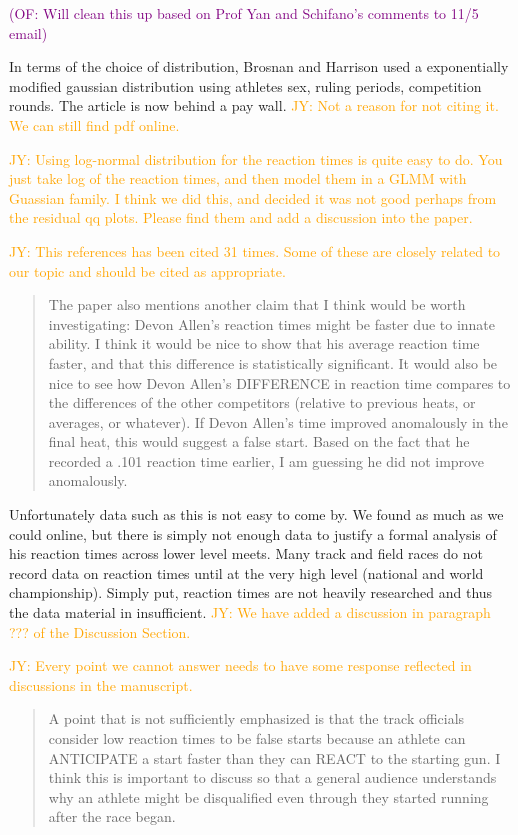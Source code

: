 \documentclass[12pt]{article}
\newcommand{\jy}[1]{\textcolor{orange}{JY: #1}}
\newcommand{\of}[1]{\textcolor{purple}{(OF: #1)}}
\newenvironment{comment}%
{\begin{quotation}\noindent\small\it\color{darkblue}\ignorespaces%
}{\end{quotation}}
\begin{document}
\of{Will clean this up based on Prof Yan and Schifano's comments to 11/5 email}

In terms of the choice of distribution, Brosnan and Harrison used a exponentially
modified gaussian distribution using athletes sex, ruling periods, competition
rounds. The article is now behind a pay wall.
\jy{Not a reason for not citing it. We can still find pdf online.}

\jy{Using log-normal distribution for the reaction times is quite easy
  to do. You just take log of the reaction times, and then model them
  in a GLMM with Guassian family. I think we did this, and decided it
  was not good perhaps from the residual qq plots. Please find them
  and add a discussion into the paper.}

\jy{This references has been cited 31 times. Some of these are closely
  related to our topic and should be cited as appropriate.}

\begin{comment}
The paper also mentions another claim that I think would be worth investigating:
Devon Allen’s reaction times might be faster due to innate ability. I think it
would be nice to show that his average reaction time faster, and that this
difference is statistically significant. It would also be nice to see how Devon
Allen’s DIFFERENCE in reaction time compares to the differences of the other
competitors (relative to previous heats, or averages, or whatever). If Devon
Allen’s time improved anomalously in the final heat, this would suggest a false
start. Based on the fact that he recorded a .101 reaction time earlier, I am
guessing he did not improve anomalously.  
\end{comment}

Unfortunately data such as this is not easy to come by.  We found as much as we
could online, but there is simply not enough data to justify a formal analysis
of his reaction times across lower level meets.  Many track and field races do
not record data on reaction times until at the very high level (national
and world championship).  Simply put, reaction times are not heavily researched
and thus the data material in insufficient.
\jy{We have added a discussion in paragraph ??? of the Discussion Section.}

\jy{Every point we cannot answer needs to have some response reflected
  in discussions in the manuscript.}

\begin{comment}
A point that is not sufficiently emphasized is that the track officials consider
low reaction times to be false starts because an athlete can ANTICIPATE a start
faster than they can REACT to the starting gun. I think this is important to
discuss so that a general audience understands why an athlete might be
disqualified even through they started running after the race began.  
\end{comment}
\end{document}
